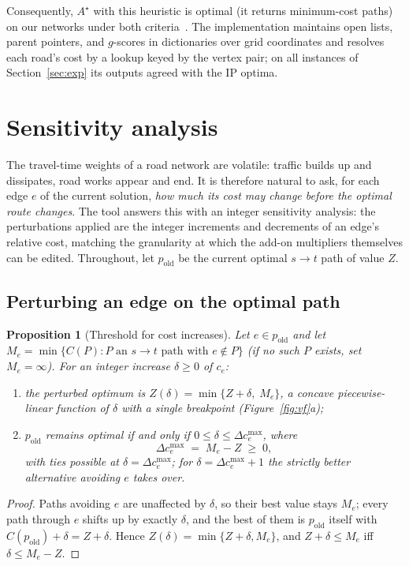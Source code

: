 \documentclass[10pt,twocolumn]{article}
\newtheorem{proposition}{Proposition}
\begin{document}
Consequently, $A^{\star}$ with this heuristic is optimal (it returns minimum-cost paths) on our
networks under both criteria~\cite{hnr68,dechterpearl85}. The implementation maintains open
lists, parent pointers, and $g$-scores in dictionaries over grid coordinates and resolves
each road's cost by a lookup keyed by the vertex pair; on all instances of
Section~\ref{sec:exp} its outputs agreed with the IP optima.

\section{Sensitivity analysis}
\label{sec:sens}

The travel-time weights of a road network are volatile: traffic builds up and dissipates,
road works appear and end. It is therefore natural to ask, for each edge $e$ of the current
solution, \emph{how much its cost may change before the optimal route changes}. The tool
answers this with an integer sensitivity analysis: the perturbations applied are the integer
increments and decrements of an edge's relative cost, matching the granularity at which the
add-on multipliers themselves can be edited. Throughout, let $p_{\text{old}}$ be the current
optimal $s\!\to\!t$ path of value $Z$.

\subsection{Perturbing an edge on the optimal path}

\begin{proposition}[Threshold for cost increases]
\label{prop:inc}
Let $e\in p_{\text{old}}$ and let
$M_e=\min\{C(P) : P \text{ an $s\!\to\!t$ path with } e\notin P\}$ (if no such $P$ exists,
set $M_e=\infty$). For an integer increase $\delta\ge 0$ of $c_e$:
\begin{enumerate}
  \item[(i)] the perturbed optimum is
        $Z(\delta)=\min\{Z+\delta,\;M_e\}$, a concave piecewise-linear function of $\delta$
        with a single breakpoint (Figure~\ref{fig:vf}a);
  \item[(ii)] $p_{\text{old}}$ remains optimal if and only if
        $0\le\delta\le\Delta c^{\max}_e$, where
        \begin{equation}
        \label{eq:threshold}
          \Delta c^{\max}_e \;=\; M_e - Z \;\ge\; 0,
        \end{equation}
        with ties possible at $\delta=\Delta c^{\max}_e$; for
        $\delta=\Delta c^{\max}_e+1$ the strictly better alternative avoiding $e$ takes
        over.
\end{enumerate}
\end{proposition}
\begin{proof}
Paths avoiding $e$ are unaffected by $\delta$, so their best value stays $M_e$; every path
through $e$ shifts up by exactly $\delta$, and the best of them is $p_{\text{old}}$ itself
with $C(p_{\text{old}})+\delta=Z+\delta$. Hence
$Z(\delta)=\min\{Z+\delta,M_e\}$, and $Z+\delta\le M_e$ iff $\delta\le M_e-Z$.
\end{proof}
\end{document}
